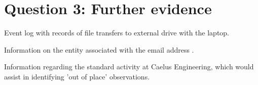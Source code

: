 \section{Question 3: Further evidence} %
\label{sub:question_further_evidence}

\begin{myenum}
	\item Event log with records of file transfers to external drive with the laptop.
	\item Information on the entity associated with the email address .
	\item Information regarding the standard activity at Caelus Engineering, which would assist in identifying 'out of place' observations.
\end{myenum}

